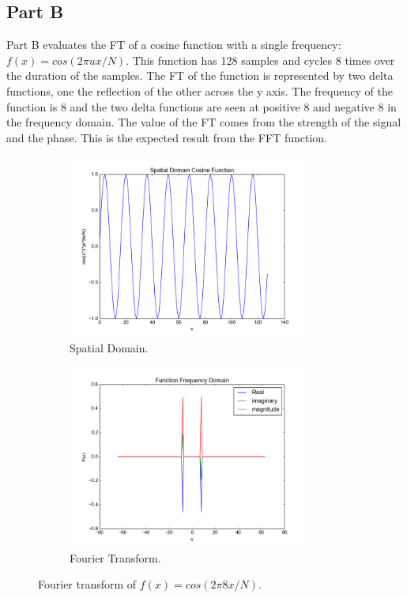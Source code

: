 \documentclass[letter]{article}
\begin{document}
\subsection{Part B}
Part B evaluates the FT of a cosine function with a single frequency: $f(x) = cos(2 \pi u x / N)$. This function has 128 samples and cycles 8 times over the duration of the samples. The FT of the function is represented by two delta functions, one the reflection of the other across the y axis. The frequency of the function is 8 and the two delta functions are seen at positive 8 and negative 8 in the frequency domain. The value of the FT comes from the strength of the signal and the phase. This is the expected result from the FFT function.
\begin{figure}[hbtp]
  \centering
  \begin{subfigure}{8cm}
    \includegraphics[width=8cm]{images/cosine_plot_time.png}
    \caption{Spatial Domain.}
  \end{subfigure}
  \begin{subfigure}{8cm}
    \includegraphics[width=8cm]{images/function_cosine_plot.png}
    \caption{Fourier Transform.}
  \end{subfigure}
  \caption{Fourier transform of $f(x)=cos(2\pi 8x/N)$.}
  \label{fig:ft_cos}
\end{figure}
\end{document}
